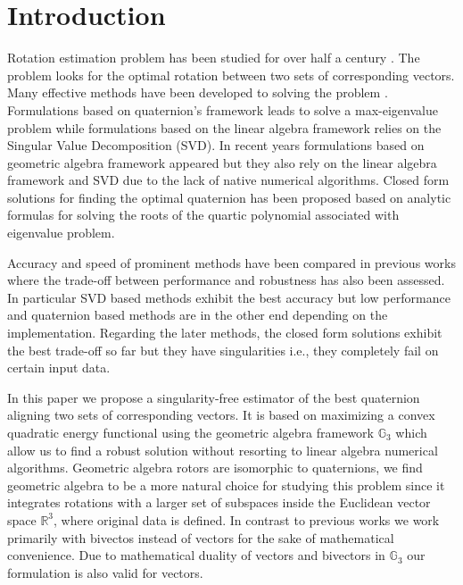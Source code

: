 \documentclass{birkjour}
\numberwithin{equation}{section}
\begin{document}
\maketitle
\section{Introduction}

\indent Rotation estimation problem has been studied for over half a century \cite{Wahba1965}. The problem looks for the optimal rotation between two sets of corresponding vectors. Many effective methods have been developed to solving the problem \cite{Arun1987, Horn1987, Mortari1996, Shuster1981, Yang2015}. Formulations based on quaternion's framework leads to solve a max-eigenvalue problem while formulations based on the linear algebra framework relies on the Singular Value Decomposition (SVD). In recent years formulations based on geometric algebra framework \cite{Perwass2009, Dorst2011} appeared but they also rely on the linear algebra framework and SVD due to the lack of native numerical algorithms. Closed form solutions for finding the optimal quaternion has been proposed \cite{Yang2013, Wu2017, Wu2018FA3R, Wu2018FS3R} based on analytic formulas for solving the roots of the quartic polynomial associated with eigenvalue problem.

Accuracy and speed of prominent methods have been compared in previous works \cite{Eggert1997, Markley1999, Wu2017} where the trade-off between performance and robustness has also been assessed. In particular SVD based methods exhibit the best accuracy but low performance and quaternion based methods are in the other end depending on the implementation. Regarding the later methods, the closed form solutions exhibit the best trade-off so far but they have singularities i.e., they completely fail on certain input data.

In this paper we propose a singularity-free estimator of the best quaternion aligning two sets of corresponding vectors. It is based on maximizing a convex quadratic energy functional using the geometric algebra framework $\mathbb{G}_3$ which allow us to find a robust solution without resorting to linear algebra numerical algorithms. Geometric algebra rotors are isomorphic to quaternions, we find geometric algebra to be a more natural choice for studying this problem since it integrates rotations with a larger set of subspaces inside the Euclidean vector space $\mathbb R^3$, where original data is defined. In contrast to previous works we work primarily with bivectos instead of vectors for the sake of mathematical convenience. Due to mathematical duality of vectors and bivectors in $\mathbb{G}_3$ our formulation is also valid for vectors.
\end{document}
